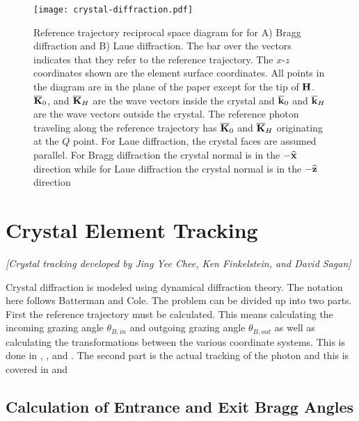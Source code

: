 \begin{figure}[tb]
  \centering
  \texttt{[image: crystal-diffraction.pdf]}
  \caption[Reference trajectory reciprocal space diagram for crystal diffraction.]
{Reference trajectory reciprocal space diagram for for A) Bragg diffraction and B) Laue
diffraction. The bar over the vectors indicates that they refer to the reference trajectory. The
$x$-$z$ coordinates shown are the element surface coordinates. All points in the diagram are in the
plane of the paper except for the tip of ${\bf H}$.  $\overline{{\bf K}}_{0}$, and $\overline{{\bf K}}_{H}$ are the wave
vectors inside the crystal and $\overline{{\bf k}}_{0}$ and $\overline{{\bf k}}_{H}$ are the wave vectors outside the
crystal. The reference photon traveling along the reference trajectory has $\overline{{\bf K}}_0$ and
$\overline{{\bf K}}_H$ originating at the $Q$ point. For Laue diffraction, the crystal faces are assumed
parallel.  For Bragg diffraction the crystal normal is in the $-{\widehat{\bf x}}$ direction while for Laue
diffraction the crystal normal is in the $-{\widehat{\bf z}}$ direction
  }
  \label{f:crystal.diffraction}
\end{figure}

\section{Crystal Element Tracking}
\label{s:crystal.tracking}

\textit{\large [Crystal tracking developed by Jing Yee Chee, Ken Finkelstein, and David Sagan]}

Crystal diffraction is modeled using dynamical diffraction theory. The notation here follows
Batterman and Cole\cite{b:batterman}.  The problem can be divided up into two parts. First the
reference trajectory must be calculated. This means calculating the incoming grazing angle
$\theta_{B,in}$ and outgoing grazing angle $\theta_{B,out}$ as well as calculating the
transformations between the various coordinate systems. This is done in ,
, and .  The second part is the actual tracking of the photon
and this is covered in  and 

\subsection{Calculation of Entrance and Exit Bragg Angles}
\label{s:crystal.ref}

